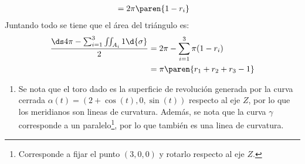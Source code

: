 \documentclass{homework}
\begin{document}
\begin{sol}
\begin{enumerate}
\begin{align*}
                                                                            & =2\pi\paren{1-r_i}                                                          \\
              \end{align*}
              Juntando todo se tiene que el área del triángulo es:
              \begin{align*}
                  \dfrac{\ds4\pi-\sum_{i=1}^3\iint_{A_i}1\d{\sigma}}2 & =2\pi-\sum_{i=1}^3\pi(1-r_i) \\
                                                                      & =\pi\paren{r_1+r_2+r_3-1}
              \end{align*}
    \end{enumerate}
\end{sol}

\begin{sol}
    \begin{enumerate}
        \item Se nota que el toro dado es la superficie de revolución generada por la curva cerrada \(\alpha(t)=(2+\cos(t),0,\sin(t))\) respecto al eje \(Z\), por lo que los meridianos son lineas de curvatura. Además, se nota que la curva \(\gamma\) corresponde a un paralelo\footnote{Corresponde a fijar el punto \((3,0,0)\) y rotarlo respecto al eje \(Z\).}, por lo que también es una linea de curvatura.
    \end{enumerate}
\end{sol}
\end{document}
